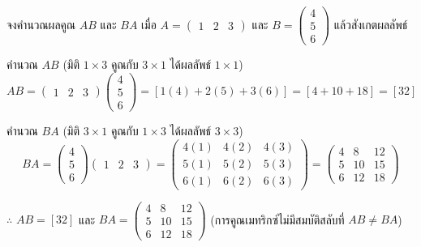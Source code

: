\begin{ex}
\label{ex:matrix-multiply-nonsquare}
จงคำนวณผลคูณ $AB$ และ $BA$ เมื่อ $A = \begin{pmatrix} 1 & 2 & 3 \end{pmatrix}$ และ $B = \begin{pmatrix} 4 \\ 5 \\ 6 \end{pmatrix}$ แล้วสังเกตผลลัพธ์
\end{ex}
\begin{solution}
คำนวณ $AB$ (มิติ $1 \times 3$ คูณกับ $3 \times 1$ ได้ผลลัพธ์ $1 \times 1$) \[ AB = \begin{pmatrix} 1 & 2 & 3 \end{pmatrix}\begin{pmatrix} 4 \\ 5 \\ 6 \end{pmatrix} = [1(4)+2(5)+3(6)] = [4+10+18] = [32] \]

คำนวณ $BA$ (มิติ $3 \times 1$ คูณกับ $1 \times 3$ ได้ผลลัพธ์ $3 \times 3$) \[ BA = \begin{pmatrix} 4 \\ 5 \\ 6 \end{pmatrix}\begin{pmatrix} 1 & 2 & 3 \end{pmatrix} = \begin{pmatrix} 4(1) & 4(2) & 4(3) \\ 5(1) & 5(2) & 5(3) \\ 6(1) & 6(2) & 6(3) \end{pmatrix} = \begin{pmatrix} 4 & 8 & 12 \\ 5 & 10 & 15 \\ 6 & 12 & 18 \end{pmatrix} \]

$\therefore$ $AB = [32]$ และ $BA = \begin{pmatrix} 4 & 8 & 12 \\ 5 & 10 & 15 \\ 6 & 12 & 18 \end{pmatrix}$ (การคูณเมทริกซ์ไม่มีสมบัติสลับที่ $AB \neq BA$) \solhere
\end{solution}

